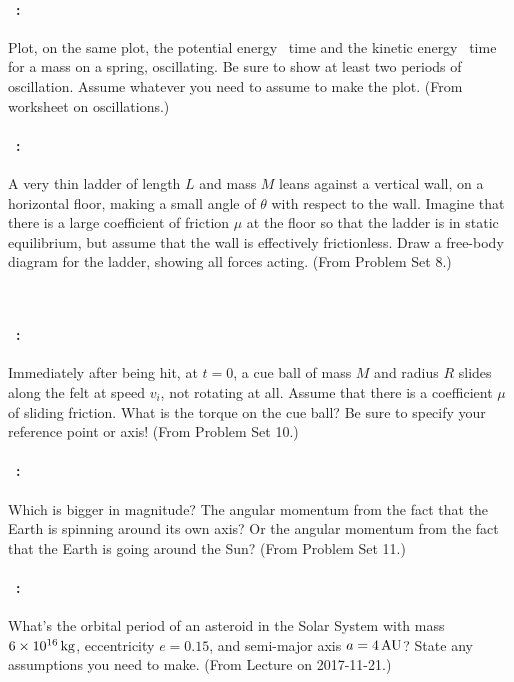 \documentclass[12pt]{article} 
\begin{document}
\vfill

\paragraph{\problemname~\theproblem:}%
Plot, on the same plot, the potential energy \vs\ time and the kinetic
energy \vs\ time for a mass on a spring, oscillating. Be sure to show at
least two periods of oscillation. Assume whatever you need to assume to
make the plot.
(From worksheet on oscillations.)

\vfill

\paragraph{\problemname~\theproblem:}%
A very thin ladder of length $L$ and mass $M$ leans against a vertical
wall, on a horizontal floor, making a small angle of $\theta$ with respect
to the wall.  Imagine that there is a large coefficient of friction
$\mu$ at the floor so that the ladder is in static
equilibrium, but assume that the wall is effectively frictionless.
Draw a free-body diagram for the ladder, showing all
forces acting.
(From Problem Set 8.)

\vfill
~
\clearpage

\paragraph{\problemname~\theproblem:}%
Immediately after being hit, at $t=0$, a cue ball of mass
$M$ and radius $R$ slides along the felt at speed $v_i$, not rotating
at all.
Assume that there is a
coefficient $\mu$ of sliding friction.
What is the torque on the cue ball? Be sure to specify your reference point or axis!
(From Problem Set 10.)

\vfill

\paragraph{\problemname~\theproblem:}%
Which is bigger in magnitude? The angular momentum from the fact
that the Earth is spinning around its own axis? Or the angular
momentum from the fact that the Earth is going around the Sun?
(From Problem Set 11.)

\vfill

\paragraph{\problemname~\theproblem:}%
What's the orbital period of an asteroid in the Solar System with mass
$6\times 10^{16}\,\mathrm{kg}$, eccentricity $e=0.15$, and semi-major axis
$a=4\,\mathrm{AU}$? State any assumptions you need to make.
(From Lecture on 2017-11-21.)
\end{document}
